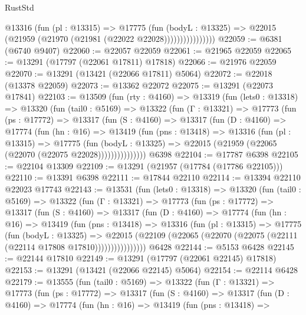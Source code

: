 \begin{lexlean}{RustStd}
\begin{coremodule}
                      @13316
                        (fun (pl : @13315) =>
                        @17775
                          (fun (bodyL : @13325) =>
                          @22015 (@21959 (@21970 (@21981 (@22022 @22028))))))))))))))))
@22059 := @6381 (@6740 @9407)
@22060 := @22057 @22059
@22061 := @21965 @22059
@22065 := @13291 (@17797 (@22061 @17811) @17818)
@22066 := @21976 @22059
@22070 := @13291 (@13421 (@22066 @17811) @5064)
@22072 := @22018 (@13378 @22059)
@22073 := @13362 @22072
@22075 := @13291 (@22073 @17841)
@22103 := @13509
    (fun (rty : @4160) =>
    @13319
      (fun (lets0 : @13318) =>
      @13320
        (fun (tail0 : @5169) =>
        @13322
          (fun (Γ : @13321) =>
          @17773
            (fun (ps : @17772) =>
            @13317
              (fun (S : @4160) =>
              @13317
                (fun (D : @4160) =>
                @17774
                  (fun (hn : @16) =>
                  @13419
                    (fun (pns : @13418) =>
                    @13316
                      (fun (pl : @13315) =>
                      @17775
                        (fun (bodyL : @13325) =>
                        @22015 (@21959 (@22065 (@22070 (@22075 @22028)))))))))))))))
    @6398
@22104 := @17787 @6398
@22105 := @22104 @13309
@22109 := @13291 (@21957 (@17784 (@17786 @22105)))
@22110 := @13391 @6398
@22111 := @17844 @22110
@22114 := @13394 @22110 @22023 @17743
@22143 := @13531
    (fun (lets0 : @13318) =>
    @13320
      (fun (tail0 : @5169) =>
      @13322
        (fun (Γ : @13321) =>
        @17773
          (fun (ps : @17772) =>
          @13317
            (fun (S : @4160) =>
            @13317
              (fun (D : @4160) =>
              @17774
                (fun (hn : @16) =>
                @13419
                  (fun (pns : @13418) =>
                  @13316
                    (fun (pl : @13315) =>
                    @17775
                      (fun (bodyL : @13325) =>
                      @22015
                        (@22109
                          (@22065 (@22070 (@22075 (@22111 (@22114 @17808 @17810))))))))))))))))
    @6428
@22144 := @5153 @6428
@22145 := @22144 @17810
@22149 := @13291 (@17797 (@22061 @22145) @17818)
@22153 := @13291 (@13421 (@22066 @22145) @5064)
@22154 := @22114 @6428
@22179 := @13555
    (fun (tail0 : @5169) =>
    @13322
      (fun (Γ : @13321) =>
      @17773
        (fun (ps : @17772) =>
        @13317
          (fun (S : @4160) =>
          @13317
            (fun (D : @4160) =>
            @17774
              (fun (hn : @16) =>
              @13419
                (fun (pns : @13418) =>

\end{coremodule}
\end{lexlean}
